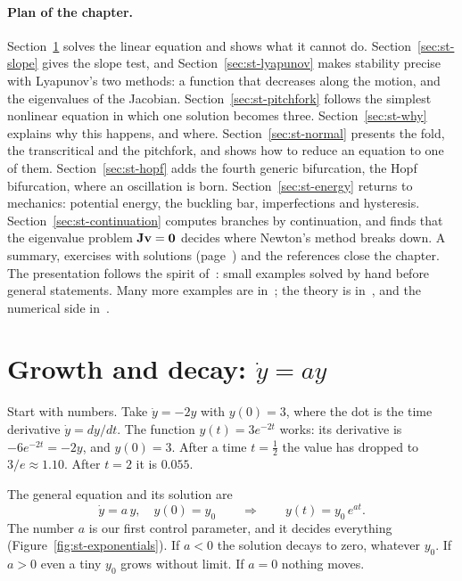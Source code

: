 \paragraph{Plan of the chapter.}
Section~\ref{sec:st-linear} solves the linear equation and shows what it cannot
do. Section~\ref{sec:st-slope} gives the slope test, and
Section~\ref{sec:st-lyapunov} makes stability precise with Lyapunov's two methods:
a function that decreases along the motion, and the eigenvalues of the Jacobian.
Section~\ref{sec:st-pitchfork} follows the simplest nonlinear equation in which
one solution becomes three. Section~\ref{sec:st-why} explains why this happens,
and where. Section~\ref{sec:st-normal} presents the fold, the transcritical and
the pitchfork, and shows how to reduce an equation to one of them.
Section~\ref{sec:st-hopf} adds the fourth generic bifurcation, the Hopf
bifurcation, where an oscillation is born. Section~\ref{sec:st-energy} returns to
mechanics: potential energy, the buckling bar, imperfections and hysteresis.
Section~\ref{sec:st-continuation} computes branches by continuation, and finds
that the eigenvalue problem $\mathbf{J}\mathbf{v} = \mathbf{0}$ decides where Newton's method
breaks down. A summary, exercises with solutions
(page~\pageref{sec:st-exo}) and the references close the chapter. The presentation follows the spirit
of~\cite{st-strang2014}: small examples solved by hand before general statements.
Many more examples are in~\cite{st-strogatz2015}; the theory is
in~\cite{st-guckenheimer1983,st-kuznetsov2004}, and the numerical side
in~\cite{st-seydel2010}.

\section{Growth and decay: \texorpdfstring{$\dot y = ay$}{y' = ay}}\label{sec:st-linear}
%

Start with numbers. Take $\dot y = -2y$ with $y(0) = 3$, where the dot is the
time derivative $\dot y = dy/dt$. The function $y(t) = 3e^{-2t}$ works: its
derivative is $-6e^{-2t} = -2y$, and $y(0) = 3$. After a time $t = \tfrac12$ the
value has dropped to $3/e \approx 1.10$. After $t = 2$ it is $0.055$.

The general equation and its solution are
\begin{equation}\label{eq:st-linear}
  \dot y = a\,y, \quad y(0) = y_0
  \qquad\Longrightarrow\qquad
  y(t) = y_0\,e^{at}.
\end{equation}
The number $a$ is our first control parameter, and it decides everything
(Figure~\ref{fig:st-exponentials}). If $a < 0$ the solution decays to zero,
whatever $y_0$. If $a > 0$ even a tiny $y_0$ grows without limit. If $a = 0$
nothing moves.


